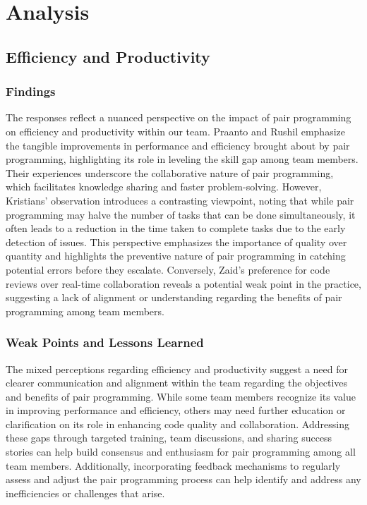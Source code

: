 \section{Analysis}
\subsection{Efficiency and Productivity}
\subsubsection{Findings}
The responses reflect a nuanced perspective on the impact of pair programming on efficiency and productivity within our team. Praanto and Rushil emphasize the tangible improvements in performance and efficiency brought about by pair programming, highlighting its role in leveling the skill gap among team members. Their experiences underscore the collaborative nature of pair programming, which facilitates knowledge sharing and faster problem-solving. However, Kristians' observation introduces a contrasting viewpoint, noting that while pair programming may halve the number of tasks that can be done simultaneously, it often leads to a reduction in the time taken to complete tasks due to the early detection of issues. This perspective emphasizes the importance of quality over quantity and highlights the preventive nature of pair programming in catching potential errors before they escalate. Conversely, Zaid's preference for code reviews over real-time collaboration reveals a potential weak point in the practice, suggesting a lack of alignment or understanding regarding the benefits of pair programming among team members.
\subsubsection{Weak Points and Lessons Learned} 
The mixed perceptions regarding efficiency and productivity suggest a need for clearer communication and alignment within the team regarding the objectives and benefits of pair programming. While some team members recognize its value in improving performance and efficiency, others may need further education or clarification on its role in enhancing code quality and collaboration. Addressing these gaps through targeted training, team discussions, and sharing success stories can help build consensus and enthusiasm for pair programming among all team members. Additionally, incorporating feedback mechanisms to regularly assess and adjust the pair programming process can help identify and address any inefficiencies or challenges that arise.

